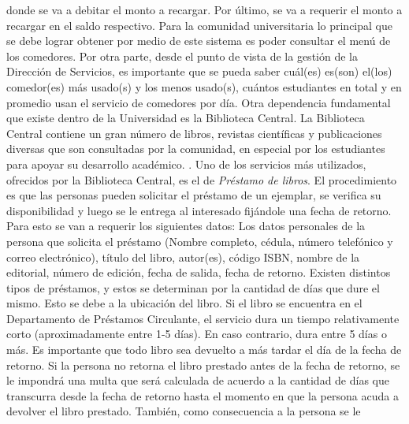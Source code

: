 \documentclass[12pt,a4paper,spanish]{article}
\begin{document}
donde se va a debitar el monto a recargar. Por \'ultimo, se va a
requerir el monto a recargar en el saldo respectivo.
\newline
\newline  
\indent Para la comunidad universitaria lo principal que se
debe lograr obtener por medio de este sistema es poder consultar el men\'u de los comedores. 
Por otra parte, desde el punto de vista
de la gesti\'on de la Direcci\'on de Servicios, es importante que se pueda saber
cu\'al(es) es(son) el(los) comedor(es) m\'as usado(s) y los menos
usado(s), cu\'antos estudiantes en total y en promedio usan el servicio de comedores por
d\'ia.
\newline
\newline
\indent Otra dependencia fundamental que existe dentro de la
Universidad es la Biblioteca Central. La Biblioteca
Central contiene un gran n\'umero de libros, revistas cient\'ificas y 
publicaciones diversas que son consultadas por la comunidad, en
especial por los estudiantes para apoyar su desarrollo acad\'emico.
\newline
\newline
\indent. Uno de los servicios m\'as utilizados, ofrecidos por la Biblioteca Central, 
es el de \emph{Pr\'estamo de libros}. El procedimiento es que las personas pueden solicitar
el pr\'estamo de un ejemplar, se verifica su disponibilidad y luego
se le entrega al interesado fij\'andole una fecha de retorno. Para esto se van a requerir los
siguientes datos: Los datos personales de la persona que solicita el
pr\'estamo (Nombre completo, c\'edula, n\'umero telef\'onico y correo electr\'onico), t\'itulo del libro, autor(es),
c\'odigo ISBN, nombre de la editorial, n\'umero de edici\'on, fecha de salida,
fecha de retorno. Existen distintos tipos de pr\'estamos, y estos se
determinan por la cantidad de d\'ias que dure el mismo. Esto se debe a
la ubicaci\'on del libro. Si el libro se encuentra en el Departamento
de Pr\'estamos Circulante, el servicio dura un tiempo relativamente corto (aproximadamente entre 1-5 d\'ias). En caso
contrario, dura entre 5 d\'ias o m\'as. 
\newline
\newline
\indent Es importante que todo libro sea devuelto a
m\'as tardar el d\'ia de la fecha de retorno. Si la persona no retorna el libro
prestado antes de la fecha de retorno, se le impondr\'a una multa que
ser\'a calculada de acuerdo a la cantidad de d\'ias que transcurra
desde la fecha de retorno hasta el momento en que la persona acuda a
devolver el libro prestado. Tambi\'en, como consecuencia a la persona se le
\end{document}
